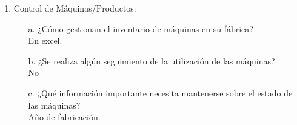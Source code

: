 \documentclass{article}
\begin{document}
    \begin{enumerate}[start=5]
        \item Control de Máquinas/Productos:
            \begin{enumerate}[label=\Alph*.]
                \item[a.] ¿Cómo gestionan el inventario de máquinas en su fábrica? \\
                    En excel.
                \item[b.] ¿Se realiza algún seguimiento de la utilización de las máquinas? \\
                    No
                \item[c.] ¿Qué información importante necesita mantenerse sobre el estado de las máquinas? \\
                    Año de fabricación.
            \end{enumerate}
    \end{enumerate}

    
\end{document}
